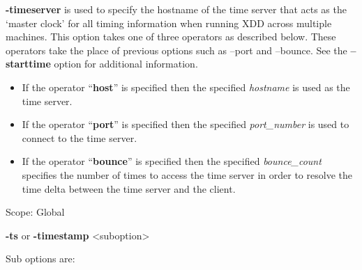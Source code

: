 \textbf{-timeserver} is used to specify the hostname of the time server that acts as the `master clock' for all timing information when running XDD across multiple machines. This option takes one of three operators as described below. These operators take the place of previous options such as --port and --bounce. See the \textbf{--starttime} option for additional information.

\begin{itemize}
\item
  If the operator ``\textbf{host}'' is specified then the specified \emph{hostname} is used as the time server.
\item
  If the operator ``\textbf{port}'' is specified then the specified \emph{port\_number} is used to connect to the time server.
\item
  If the operator ``\textbf{bounce}'' is specified then the specified \emph{bounce\_count} specifies the number of times to access the time server in order to resolve the time delta between the time server and the client.
\end{itemize}

Scope: Global

\textbf{-ts} or \textbf{-timestamp} \textless suboption\textgreater{}

Sub options are:

